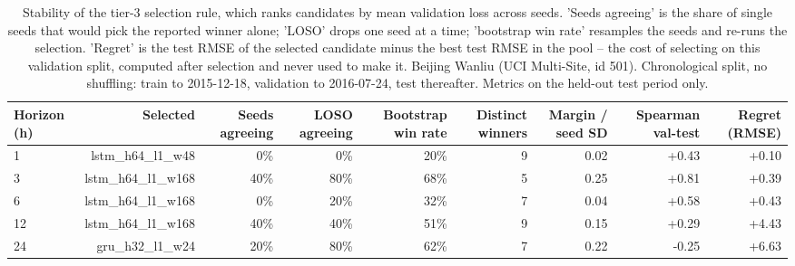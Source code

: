 \begin{table}[htbp]
\caption{Stability of the tier-3 selection rule, which ranks candidates by mean validation loss across seeds. 'Seeds agreeing' is the share of single seeds that would pick the reported winner alone; 'LOSO' drops one seed at a time; 'bootstrap win rate' resamples the seeds and re-runs the selection. 'Regret' is the test RMSE of the selected candidate minus the best test RMSE in the pool -- the cost of selecting on this validation split, computed after selection and never used to make it. Beijing Wanliu (UCI Multi-Site, id 501). Chronological split, no shuffling: train to 2015-12-18, validation to 2016-07-24, test thereafter. Metrics on the held-out test period only.}
\label{tab:selection_stability}
\begin{tabular}{lrrrrrrrr}
\toprule
Horizon (h) & Selected & Seeds agreeing & LOSO agreeing & Bootstrap win rate & Distinct winners & Margin / seed SD & Spearman val-test & Regret (RMSE) \\
\midrule
1 & lstm\_h64\_l1\_w48 & 0\% & 0\% & 20\% & 9 & 0.02 & +0.43 & +0.10 \\
3 & lstm\_h64\_l1\_w168 & 40\% & 80\% & 68\% & 5 & 0.25 & +0.81 & +0.39 \\
6 & lstm\_h64\_l1\_w168 & 0\% & 20\% & 32\% & 7 & 0.04 & +0.58 & +0.43 \\
12 & lstm\_h64\_l1\_w168 & 40\% & 40\% & 51\% & 9 & 0.15 & +0.29 & +4.43 \\
24 & gru\_h32\_l1\_w24 & 20\% & 80\% & 62\% & 7 & 0.22 & -0.25 & +6.63 \\
\bottomrule
\end{tabular}
\end{table}
